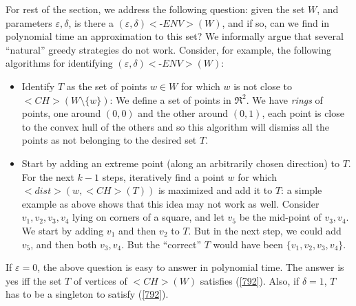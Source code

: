 \documentclass[11pt,letterpaper]{article}
\newcommand{\alert}[1]{{\color{red}#1}}
\def\mathsf#1{<#1>}%
\theoremstyle{definition}
\theoremstyle{remark}
\newcommand{\dist}{{\mathsf{dist}}}
\newcommand{\ch}{{\mathsf{CH}}}
\newcommand{\edenv}{{(\varepsilon, \delta){{\mathsf{\mbox{-}ENV}}}}}
\begin{document}
For rest of the section, we address the following question: given the set $W$, and parameters $\varepsilon, \delta$, is there a  $\edenv(W)$, and if so, can we find in polynomial time an approximation to this set? We informally argue that several ``natural'' greedy strategies do not work. Consider, for example, the following algorithms for identifying $\edenv(W)$: 
\begin{itemize}
    \item Identify $T$ as the set of points $w\in W$ for which $w$ is not close to $\ch(W\setminus \{w\})$: We define a set of points in $\Re^2$. We have {\em rings} of points, one around $ (0,0)$ and the other around $(0,1)$, each point is close to the convex hull of the others and so this algorithm will   dismiss all the points as not belonging to the desired set $T$.
    \item Start by adding an extreme point (along an arbitrarily chosen direction) to $T$. For the next $k-1$ steps, iteratively find a point $w$ for which $\dist(w,\ch(T))$ is maximized and add it to $T$: a simple example as above shows that this idea may not work as well. Consider $v_1, v_2, v_3, v_4$ lying on corners of a square, and let $v_5$ be the mid-point of $v_3, v_4$. We start by adding $v_1$ and then $v_2$ to $T$. But in the next step, we could add $v_5$, and then both $v_3, v_4$. But the ``correct'' $T$ would have been $\{v_1, v_2, v_3, v_4\}$. 
\end{itemize}
 


If $\varepsilon=0$, the above question is easy to answer in polynomial time. The answer is yes iff the set $T$ of vertices of $\ch(W)$ satisfies (\ref{792}). Also, if $\delta=1$, $T$ has to be a singleton to satisfy (\ref{792}). 
\end{document}
